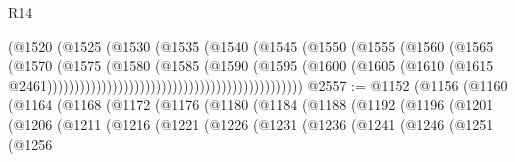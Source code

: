 \begin{lexlean}{R14}
\begin{coremodule}
                                                          (@1520
                                                            (@1525
                                                              (@1530
                                                                (@1535
                                                                  (@1540
                                                                    (@1545
                                                                      (@1550
                                                                        (@1555
                                                                          (@1560
                                                                            (@1565
                                                                              (@1570
                                                                                (@1575
                                                                                  (@1580
                                                                                    (@1585
                                                                                      (@1590
                                                                                        (@1595
                                                                                          (@1600
                                                                                            (@1605
                                                                                              (@1610
                                                                                                (@1615
                                                                                                  @2461)))))))))))))))))))))))))))))))))))))))))))))))
@2557 := @1152
    (@1156
      (@1160
        (@1164
          (@1168
            (@1172
              (@1176
                (@1180
                  (@1184
                    (@1188
                      (@1192
                        (@1196
                          (@1201
                            (@1206
                              (@1211
                                (@1216
                                  (@1221
                                    (@1226
                                      (@1231
                                        (@1236
                                          (@1241
                                            (@1246
                                              (@1251
                                                (@1256

\end{coremodule}
\end{lexlean}
